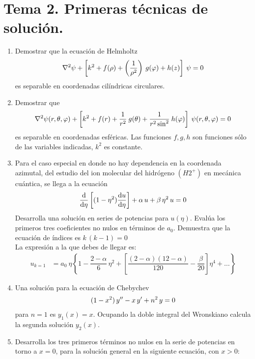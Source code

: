 \section{Tema 2. Primeras técnicas de solución.}
\begin{enumerate}
\item Demostrar que la ecuación de Helmholtz
\begin{align*}
\laplacian \psi + \left[ k^{2} + f(\rho) + \left( \dfrac{1}{\rho^{2}} \right) \: g(\varphi) + h(z) \right] \: \psi = 0
\end{align*}
es separable en coordenadas cilíndricas circulares.
\item Demostrar que
\begin{align*}
\laplacian \psi (r, \theta, \varphi) + \left[ k^{2} + f(r) + \dfrac{1}{r^{2}} \: g(\theta) + \dfrac{1}{r^{2} \sin^{2}} \: h(\varphi) \right] \: \psi (r, \theta, \varphi) = 0
\end{align*}
es separable en coordenadas esféricas. Las funciones $f, g, h$ son funciones sólo de las variables indicadas, $k^{2}$ es constante.
\item Para el caso especial en donde no hay dependencia en la coordenada azimutal, del estudio del ion molecular del hidrógeno $(H2^{+})$ en mecánica cuántica, se llega a la ecuación
\begin{align*}
\dv{\eta} \left[ (1 - \eta^{2} ) \dv{u}{\eta} \right] + \alpha \, u + \beta \, \eta^{2} \, u = 0
\end{align*}
Desarrolla una solución en series de potencias para $u(\eta)$. Evalúa los primeros tres coeficientes no nulos en términos de $a_{0}$. Demuestra que la ecuación de índices es $k \, (k - 1) = 0$
\\
La expresión a la que debes de llegar es:
\begin{align*}
u_{k=1} &=  a_{0} \: \eta \left\lbrace 1 - \dfrac{2- \alpha}{6} \, \eta^{2} + \left[ \dfrac{(2-\alpha)(12-\alpha)}{120} - \dfrac{\beta}{20} \right] \eta^{4} + \ldots \right\rbrace
\end{align*}
\item Una solución para la ecuación de Chebychev
\begin{align*}
(1 -x^{2}) \, {y}^{\prime \prime} - x \, {y}^{\prime} + n^{2} \, y = 0
\end{align*}
para $n = 1$ es $y_{1}(x) = x$. Ocupando la doble integral del Wronskiano calcula la segunda solución $y_{2}(x)$.
\item Desarrolla los tres primeros términos no nulos en la serie de potencias en torno a $x = 0$, para la solución general en la siguiente ecuación, con $x > 0$:

\end{enumerate}
